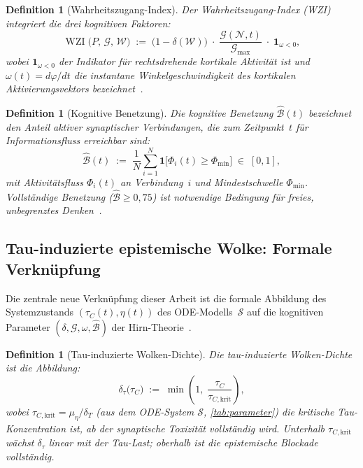 ﻿\documentclass[12pt,a4paper]{article}
\newtheorem{definition}[theorem]{Definition}
\theoremstyle{definition}
\DeclareMathOperator{\WZI}{WZI}
\begin{document}
	\begin{definition}[Wahrheitszugang-Index]
		\label{def:wzi_tany}
		Der \emph{Wahrheitszugang-Index} (WZI) integriert die drei kognitiven Faktoren:
		\[
			\WZI\bigl(P,\,\mathcal{G},\,\mathcal{W}\bigr)
			\;:=\;
			\bigl(1 - \delta(\mathcal{W})\bigr)
			\;\cdot\;
			\frac{\mathcal{G}(\mathcal{N},t)}{\mathcal{G}_{\max}}
			\;\cdot\;
			\mathbf{1}_{\omega < 0},
		\]
		wobei $\mathbf{1}_{\omega < 0}$ der Indikator für rechtsdrehende kortikale
		Aktivität ist und $\omega(t) = d\varphi/dt$ die instantane Winkelgeschwindigkeit
		des kortikalen Aktivierungsvektors bezeichnet~\cite{Epp2026brn}.
	\end{definition}

	\begin{definition}[Kognitive Benetzung]
		\label{def:kognbenet}
		Die \emph{kognitive Benetzung} $\hat{\mathcal{B}}(t)$ bezeichnet den Anteil
		aktiver synaptischer Verbindungen, die zum Zeitpunkt~$t$ für Informationsfluss
		erreichbar sind:
		\[
			\hat{\mathcal{B}}(t) \;:=\; \frac{1}{N} \sum_{i=1}^N
			\mathbf{1}\bigl[\Phi_i(t) \geq \Phi_{\min}\bigr] \;\in\; [0,1],
		\]
		mit Aktivitätsfluss $\Phi_i(t)$ an Verbindung~$i$ und Mindestschwelle $\Phi_{\min}$.
		Vollständige Benetzung ($\hat{\mathcal{B}} \geq 0{,}75$) ist notwendige Bedingung
		für freies, unbegrenztes Denken~\cite{Epp2026brn}.
	\end{definition}

	\subsection{Tau-induzierte epistemische Wolke: Formale Verknüpfung}

	Die zentrale neue Verknüpfung dieser Arbeit ist die formale Abbildung des
	Systemzustands $(\tau_C(t), \eta(t))$ des ODE-Modells~$\mathcal{S}$ auf die kognitiven
	Parameter $(\delta, \mathcal{G}, \omega, \hat{\mathcal{B}})$ der Hirn-Theorie~\cite{Epp2026brn}.

	\begin{definition}[Tau-induzierte Wolken-Dichte]
		\label{def:taucloud}
		Die \emph{tau-induzierte Wolken-Dichte} ist die Abbildung:
		\[
			\delta_\tau\bigl(\tau_C\bigr)
			\;:=\; \min\!\left(1,\;\frac{\tau_C}{\tau_{C,\mathrm{krit}}}\right),
		\]
		wobei $\tau_{C,\mathrm{krit}} = \mu_\eta / \delta_T$ (aus dem ODE-System $\mathcal{S}$,
		\cref{tab:parameter}) die kritische Tau-Konzentration ist, ab der synaptische
		Toxizität vollständig wird. Unterhalb $\tau_{C,\mathrm{krit}}$ wächst $\delta_\tau$
		linear mit der Tau-Last; oberhalb ist die epistemische Blockade vollständig.
	\end{definition}
\end{document}
